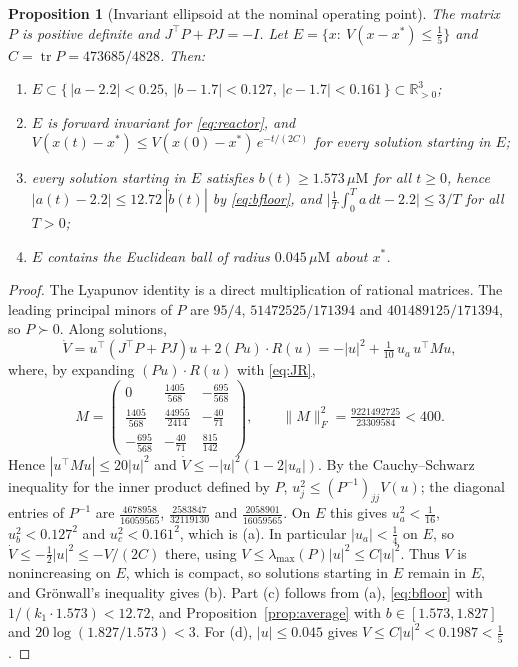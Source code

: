 \documentclass[11pt,a4paper]{article}
\theoremstyle{plain}
\newtheorem{proposition}[theorem]{Proposition}
\theoremstyle{definition}
\theoremstyle{remark}
\newcommand{\R}{\mathbb{R}}
\newcommand{\tr}{\operatorname{tr}}
\newcommand{\muM}{\mu\mathrm{M}}
\begin{document}
\begin{proposition}[Invariant ellipsoid at the nominal operating point]\label{prop:ellipsoid}
The matrix $P$ is positive definite and $J^{\!\top}P+PJ=-I$. Let $E=\{x:\ V(x-x^*)\le\tfrac15\}$ and $C=\tr P=473685/4828$. Then:
\begin{enumerate}[label=(\alph*)]
\item $E\subset\{\,|a-2.2|<0.25,\ |b-1.7|<0.127,\ |c-1.7|<0.161\,\}\subset\R^3_{>0}$;
\item $E$ is forward invariant for \eqref{eq:reactor}, and $V(x(t)-x^*)\le V(x(0)-x^*)\,e^{-t/(2C)}$ for every solution starting in $E$;
\item every solution starting in $E$ satisfies $b(t)\ge1.573\,\muM$ for all $t\ge0$, hence $|a(t)-2.2|\le12.72\,|\dot b(t)|$ by \eqref{eq:bfloor}, and $\bigl|\frac1T\int_0^Ta\,dt-2.2\bigr|\le3/T$ for all $T>0$;
\item $E$ contains the Euclidean ball of radius $0.045\,\muM$ about $x^*$.
\end{enumerate}
\end{proposition}
\begin{proof}
The Lyapunov identity is a direct multiplication of rational matrices. The leading principal minors of $P$ are $95/4$, $51472525/171394$ and $401489125/171394$, so $P\succ0$. Along solutions,
\[
  \dot V=u^{\!\top}(J^{\!\top}P+PJ)u+2(Pu)\cdot R(u)=-|u|^2+\tfrac1{10}\,u_a\,u^{\!\top}Mu,
\]
where, by expanding $(Pu)\cdot R(u)$ with \eqref{eq:JR},
\[
  M=\begin{pmatrix}0&\tfrac{1405}{568}&-\tfrac{695}{568}\\[3pt] \tfrac{1405}{568}&\tfrac{44955}{2414}&-\tfrac{40}{71}\\[3pt] -\tfrac{695}{568}&-\tfrac{40}{71}&\tfrac{815}{142}\end{pmatrix},\qquad \|M\|_F^2=\tfrac{9221492725}{23309584}<400 .
\]
Hence $|u^{\!\top}Mu|\le20|u|^2$ and $\dot V\le-|u|^2(1-2|u_a|)$. By the Cauchy--Schwarz inequality for the inner product defined by $P$, $u_j^2\le(P^{-1})_{jj}V(u)$; the diagonal entries of $P^{-1}$ are $\tfrac{4678958}{16059565}$, $\tfrac{2583847}{32119130}$ and $\tfrac{2058901}{16059565}$. On $E$ this gives $u_a^2<\tfrac1{16}$, $u_b^2<0.127^2$ and $u_c^2<0.161^2$, which is (a). In particular $|u_a|<\tfrac14$ on $E$, so $\dot V\le-\tfrac12|u|^2\le-V/(2C)$ there, using $V\le\lambda_{\max}(P)|u|^2\le C|u|^2$. Thus $V$ is nonincreasing on $E$, which is compact, so solutions starting in $E$ remain in $E$, and Gr\"onwall's inequality gives (b). Part (c) follows from (a), \eqref{eq:bfloor} with $1/(k_1\cdot1.573)<12.72$, and Proposition~\ref{prop:average} with $b\in[1.573,1.827]$ and $20\log(1.827/1.573)<3$. For (d), $|u|\le0.045$ gives $V\le C|u|^2<0.1987<\tfrac15$.
\end{proof}
\end{document}
